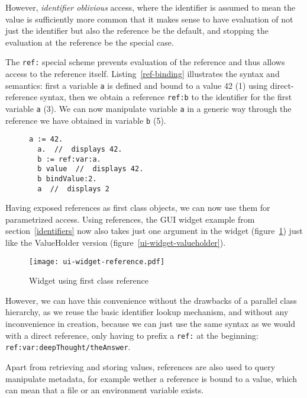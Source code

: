 \documentclass[preprint,authoryear]{acm_proc_article-sp}
\begin{document}
However, {\em identifier oblivious} access, where the identifier is assumed to mean the
value is sufficiently more common that it makes sense to have evaluation of not just
the identifier but also the reference be the default, and stopping the evaluation at the
reference be the special case.

The {\tt ref:} special scheme prevents evaluation of the reference and thus allows access
to the reference itself.  Listing~\ref{ref-binding} illustrates the syntax and semantics:
first a variable {\tt a} is defined and bound to a value 42 (1) using direct-reference syntax,
then we obtain a reference {\tt ref:b} to
the identifier for the first variable {\tt a} (3).  We can now manipulate variable {\tt a} 
in a generic way through the reference we have obtained in variable {\tt b} (5).  

\begin{figure}[htbp]
\begin{lstlisting}[style=numbers,label=ref-binding,caption=Accessing a variable via its reference.]
  a := 42.
  a.  //  displays 42.
  b := ref:var:a.
  b value  //  displays 42.
  b bindValue:2.
  a  //  displays 2
\end{lstlisting}
\end{figure}

Having exposed references as first class objects, we can now use them for parametrized 
access.   Using references, the GUI widget example from section~\ref{identifiers} now
also takes just one argument in the widget (figure~\ref{ui-widget-reference}) just like
the ValueHolder version (figure~\ref{ui-widget-valueholder}).

\begin{figure}[htbp]
\begin{center}
\texttt{[image: ui-widget-reference.pdf]}
\caption{Widget using first class reference}
\label{ui-widget-reference}
\end{center}
\end{figure}

However, we can have this convenience without the drawbacks of a parallel class
hierarchy, as we reuse the basic identifier lookup mechanism, and without any
inconvenience in creation, because we can just use the same syntax as we would
with a direct reference, only having to prefix a {\tt ref:} at the beginning:  {\tt ref:var:deepThought/theAnswer}.




Apart from retrieving and storing values, references are also used to query manipulate
metadata, for example wether a reference is bound to a value, which can mean that
a file or an environment variable exists.
\end{document}
